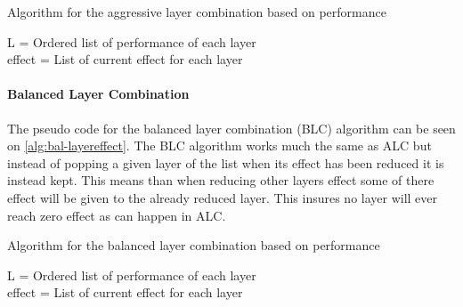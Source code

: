 \begin{algorithm}
    \caption{Algorithm for the aggressive layer combination based on performance}
    \SetAlgoLined
    L = Ordered list of performance of each layer \\
    effect  = List of current effect for each layer \\
    \label{alg:aggresive-layereffect}
\end{algorithm}

\paragraph{Balanced Layer Combination}
The pseudo code for the balanced layer combination (BLC) algorithm can be seen on \autoref{alg:bal-layereffect}.
The BLC algorithm works much the same as ALC but instead of popping a given layer of the list when its effect has been reduced it is instead kept.
This means than when reducing other layers effect some of there effect will be given to the already reduced layer.
This insures no layer will ever reach zero effect as can happen in ALC.

\begin{algorithm}
    \caption{Algorithm for the balanced layer combination based on performance}
    \SetAlgoLined
    L = Ordered list of performance of each layer \\
    effect  = List of current effect for each layer \\
    \label{alg:bal-layereffect}
\end{algorithm}

